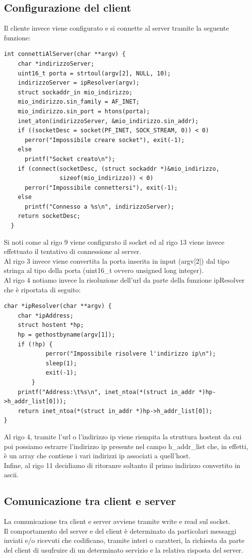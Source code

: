 \documentclass[a4paper]{article}
\begin{document}
\subsection{Configurazione del client}
Il cliente invece viene configurato e si connette al server tramite la seguente funzione:
\begin{lstlisting}[caption={Configurazione e connessione del client}]
int connettiAlServer(char **argv) {
    char *indirizzoServer;
    uint16_t porta = strtoul(argv[2], NULL, 10);
    indirizzoServer = ipResolver(argv);
    struct sockaddr_in mio_indirizzo;
    mio_indirizzo.sin_family = AF_INET;
    mio_indirizzo.sin_port = htons(porta);
    inet_aton(indirizzoServer, &mio_indirizzo.sin_addr);
    if ((socketDesc = socket(PF_INET, SOCK_STREAM, 0)) < 0)
      perror("Impossibile creare socket"), exit(-1);
    else
      printf("Socket creato\n");
    if (connect(socketDesc, (struct sockaddr *)&mio_indirizzo,
                sizeof(mio_indirizzo)) < 0)
      perror("Impossibile connettersi"), exit(-1);
    else
      printf("Connesso a %s\n", indirizzoServer);
    return socketDesc;
  }
\end{lstlisting}
Si noti come al rigo 9 viene configurato il socket ed al rigo 13 viene invece effettuato il tentativo di connessione al server.\\
Al rigo 3 invece viene convertita la porta inserita in input (argv$[$2$]$) dal tipo stringa al tipo della porta (uint16\_t ovvero unsigned long integer).\\
Al rigo 4 notiamo invece la risoluzione dell'url da parte della funzione ipResolver che è riportata di seguito:
\begin{lstlisting}[caption={Risoluzione url del client}]
char *ipResolver(char **argv) {
    char *ipAddress;
    struct hostent *hp;
    hp = gethostbyname(argv[1]);
    if (!hp) {
            perror("Impossibile risolvere l'indirizzo ip\n");
            sleep(1);
            exit(-1);
        }
    printf("Address:\t%s\n", inet_ntoa(*(struct in_addr *)hp->h_addr_list[0]));
    return inet_ntoa(*(struct in_addr *)hp->h_addr_list[0]);
}
\end{lstlisting}
Al rigo 4, tramite l'url o l'indirizzo ip viene riempita la struttura hostent da cui poi possiamo estrarre l'indirizzo ip presente nel campo 
h\_addr\_list  che, in effetti, è un array che contiene i vari indirizzi ip associati a quell'host.\\
Infine, al rigo 11 decidiamo di ritoranre soltanto il primo indirizzo convertito in ascii.
\pagebreak
\subsection{Comunicazione tra client e server}
La comunicazione tra client e server avviene tramite write e read sul socket.\\
Il comportamento del server e del client è determinato da particolari messaggi inviati e/o ricevuti che codificano, tramite interi o caratteri, la richiesta da parte del client di usufruire di un determinato servizio e la relativa risposta del server.
\end{document}
